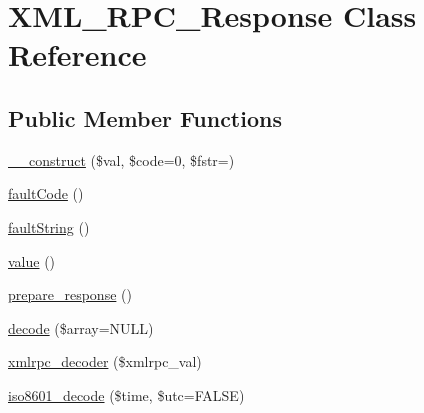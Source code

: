 \hypertarget{class_x_m_l___r_p_c___response}{}\section{X\+M\+L\+\_\+\+R\+P\+C\+\_\+\+Response Class Reference}
\label{class_x_m_l___r_p_c___response}
\subsection*{Public Member Functions}
\begin{DoxyCompactItemize}
\item 
\mbox{\hyperlink{class_x_m_l___r_p_c___response_a9e21d1002acc9528b7c79a30932be3c7}{\+\_\+\+\_\+construct}} (\$val, \$code=0, \$fstr=\textquotesingle{}\textquotesingle{})
\item 
\mbox{\hyperlink{class_x_m_l___r_p_c___response_a033b7b751ba45f86a73fa598d553f2c9}{fault\+Code}} ()
\item 
\mbox{\hyperlink{class_x_m_l___r_p_c___response_a5e1afa88fae1d58b703682e3e0df6ed5}{fault\+String}} ()
\item 
\mbox{\hyperlink{class_x_m_l___r_p_c___response_ab4c3695cda7215f664ff2759f3f5ec83}{value}} ()
\item 
\mbox{\hyperlink{class_x_m_l___r_p_c___response_a82c620f1ca3238b8c69298d00a2e97c9}{prepare\+\_\+response}} ()
\item 
\mbox{\hyperlink{class_x_m_l___r_p_c___response_a4350263fab7ad8bd76ecfe1bb0f529c6}{decode}} (\$array=N\+U\+LL)
\item 
\mbox{\hyperlink{class_x_m_l___r_p_c___response_a402e8c1a164202b6f67b400a3aa69c05}{xmlrpc\+\_\+decoder}} (\$xmlrpc\+\_\+val)
\item 
\mbox{\hyperlink{class_x_m_l___r_p_c___response_ac0c5490e6591a3e734c0941aa332a650}{iso8601\+\_\+decode}} (\$time, \$utc=F\+A\+L\+SE)
\end{DoxyCompactItemize}
